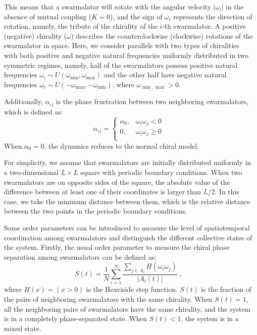 \documentclass{article}
\begin{document}
This means that a swarmalator will rotate with the angular velocity $|\omega_i |$ in the absence of mutual coupling ($K=0$), and the sign of $\omega_i$ represents the direction of rotation, namely, the tribute of the chirality of the $i$-th swarmalator. A positive (negative) chirality ($\omega$) describes the counterclockwise (clockwise) rotations of the swarmalator in space. Here, we consider parallels with two types of chiralities with both positive and negative natural frequencies uniformly distributed in two symmetric regimes, namely, half of the swarmalators possess positive natural frequencies $\omega_i \sim U\left( \omega _{\min},\omega _{\max} \right)$ and the other half have negative natural frequencies $\omega_i \sim U\left( -\omega _{\max},-\omega _{\min} \right)$, where $\omega _{\min, \max}>0$.

Additionally, $\alpha_{ij}$ is the phase frustration between two neighboring swarmalators, which is defined as:
\begin{equation}
    \alpha _{ij}=\begin{cases}
        \alpha _0,&		\omega _i\omega _j<0\\
        0,&		\omega _i\omega _j\geqslant 0\\
    \end{cases}
\end{equation}
When $\alpha_0=0$, the dynamics reduces to the normal chiral model.

For simplicity, we assume that swarmalators are initially distributed uniformly in a two-dimensional $L\times L$ square with periodic boundary conditions. When two swarmalators are on opposite sides of the square, the absolute value of the difference between at least one of their coordinates is larger than $L/2$. In this case, we take the minimum distance between them, which is the relative distance between the two points in the periodic boundary conditions.

Some order parameters can be introduced to measure the level of spatiotemporal coordination among swarmalators and distinguish the different collective states of the system. Firstly, the usual order parameter to measure the chiral phase separation among swarmalators can be defined as:
\begin{equation}
    S\left( t \right) =\frac{1}{N}\sum_{i=1}^N{\frac{\sum_{j\in A_i}{H\left( \omega _i\omega _j \right)}}{\left| A_i\left( t \right) \right|}}\;,
\end{equation}
where $H\left( x \right) =\left( x>0 \right)$ is the Heaviside step function. $S\left( t \right)$ is the fraction of the pairs of neighboring swarmalators with the same chirality. When $S\left( t \right)=1$, all the neighboring pairs of swarmalators have the same chirality, and the system is in a completely phase-separated state. When $S\left( t \right)< 1$, the system is in a mixed state.
\end{document}
